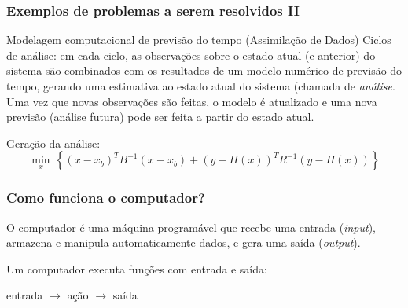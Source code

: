\documentclass[hyperref={pdfpagelabels=false}]{beamer}
\begin{document}
%
\begin{frame}
   \frametitle{Exemplos de problemas a serem resolvidos II}
   Modelagem computacional de previsão do tempo (Assimilação de Dados)
% 
	Ciclos de análise: em cada ciclo, as observações sobre o estado atual (e anterior) do sistema são combinados com os resultados de um modelo numérico de previsão do tempo, gerando uma estimativa ao estado atual do sistema (chamada de \emph{análise}. Uma vez que novas observações são feitas, o modelo é atualizado e uma nova previsão (análise futura) pode ser feita a partir do estado atual.
	
	Geração da análise:
	\begin{equation*}
	   \min_x \, \left\{ (x-x_b)^T B^{-1} (x-x_b) + (y-H(x))^TR^{-1}(y-H(x)) \right\}
	\end{equation*}

\end{frame}
%
\begin{frame}
   \frametitle{Como funciona o computador?}
   O computador é uma máquina programável que recebe uma entrada (\emph{input}), armazena e manipula automaticamente dados, e gera uma saída (\emph{output}).
   \begin{center}
		\begin{alertblock}{}
			Um computador executa funções com entrada e saída:
			\begin{center}
				entrada $\rightarrow$ ação $\rightarrow$ saída
			\end{center}
		\end{alertblock}
	\end{center}
\end{frame}
%
\end{document}
